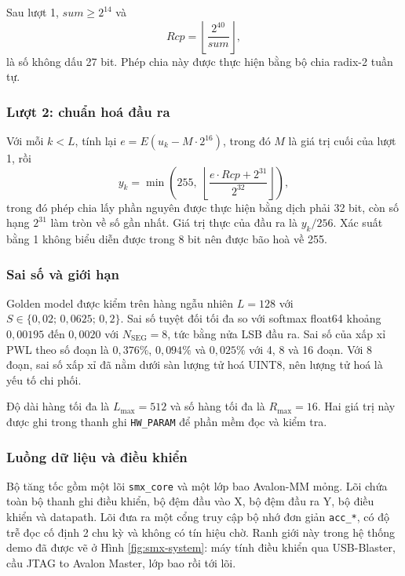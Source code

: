 Sau lượt 1, $\mathit{sum} \ge 2^{14}$ và
\begin{equation}
  \mathit{Rcp} = \left\lfloor \frac{2^{40}}{\mathit{sum}} \right\rfloor,
\end{equation}
là số không dấu 27 bit. Phép chia này được thực hiện bằng bộ chia radix-2 tuần tự.

\subsubsection{Lượt 2: chuẩn hoá đầu ra}
\label{sec:pass2}

Với mỗi $k < L$, tính lại $e = E(u_k - M \cdot 2^{16})$, trong đó $M$ là giá trị cuối của lượt 1, rồi
\begin{equation}
  y_k = \min\left(255, \; \left\lfloor \frac{e \cdot \mathit{Rcp} + 2^{31}}{2^{32}} \right\rfloor\right),
\end{equation}
trong đó phép chia lấy phần nguyên được thực hiện bằng dịch phải 32 bit, còn số hạng $2^{31}$ làm tròn về số gần nhất. Giá trị thực của đầu ra là $y_k / 256$. Xác suất bằng 1 không biểu diễn được trong 8 bit nên được bão hoà về 255.

\subsubsection{Sai số và giới hạn}
\label{sec:err}

Golden model được kiểm trên hàng ngẫu nhiên $L = 128$ với $S \in \{0{,}02;\, 0{,}0625;\, 0{,}2\}$. Sai số tuyệt đối tối đa so với softmax float64 khoảng $0{,}00195$ đến $0{,}0020$ với $N_{\text{SEG}} = 8$, tức bằng nửa LSB đầu ra. Sai số của xấp xỉ PWL theo số đoạn là $0{,}376\%$, $0{,}094\%$ và $0{,}025\%$ với 4, 8 và 16 đoạn. Với 8 đoạn, sai số xấp xỉ đã nằm dưới sàn lượng tử hoá UINT8, nên lượng tử hoá là yếu tố chi phối.

Độ dài hàng tối đa là $L_{\max} = 512$ và số hàng tối đa là $R_{\max} = 16$. Hai giá trị này được ghi trong thanh ghi \texttt{HW\_PARAM} để phần mềm đọc và kiểm tra.

\subsubsection{Luồng dữ liệu và điều khiển}
\label{sec:flow}

Bộ tăng tốc gồm một lõi \texttt{smx\_core} và một lớp bao Avalon-MM mỏng. Lõi chứa toàn bộ thanh ghi điều khiển, bộ đệm đầu vào X, bộ đệm đầu ra Y, bộ điều khiển và datapath. Lõi đưa ra một cổng truy cập bộ nhớ đơn giản \texttt{acc\_*}, có độ trễ đọc cố định 2 chu kỳ và không có tín hiệu chờ. Ranh giới này trong hệ thống demo đã được vẽ ở Hình \ref{fig:smx-system}: máy tính điều khiển qua USB-Blaster, cầu JTAG to Avalon Master, lớp bao rồi tới lõi.

